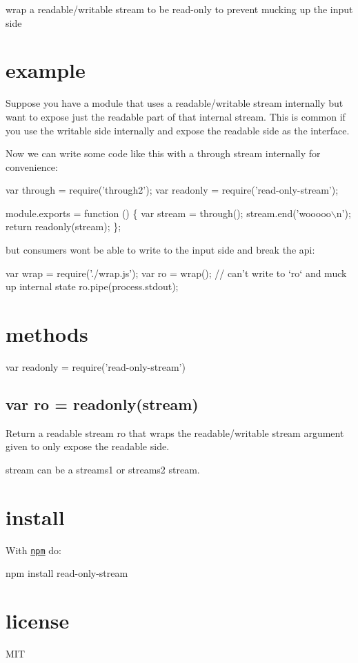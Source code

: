 wrap a readable/writable stream to be read-\/only to prevent mucking up the input side

\href{http://travis-ci.org/substack/read-only-stream}{\tt }

\section*{example}

Suppose you have a module that uses a readable/writable stream internally but want to expose just the readable part of that internal stream. This is common if you use the writable side internally and expose the readable side as the interface.

Now we can write some code like this with a {\ttfamily through} stream internally for convenience\+:


\begin{DoxyCode}
var through = require('through2');
var readonly = require('read-only-stream');

module.exports = function () \{
    var stream = through();
    stream.end('wooooo\(\backslash\)n');
    return readonly(stream);
\};
\end{DoxyCode}


but consumers won\textquotesingle{}t be able to write to the input side and break the api\+:


\begin{DoxyCode}
var wrap = require('./wrap.js');
var ro = wrap(); // can't write to `ro` and muck up internal state
ro.pipe(process.stdout);
\end{DoxyCode}


\section*{methods}


\begin{DoxyCode}
var readonly = require('read-only-stream')
\end{DoxyCode}


\subsection*{var ro = readonly(stream)}

Return a readable stream {\ttfamily ro} that wraps the readable/writable {\ttfamily stream} argument given to only expose the readable side.

{\ttfamily stream} can be a streams1 or streams2 stream.

\section*{install}

With \href{https://npmjs.org}{\tt npm} do\+:


\begin{DoxyCode}
npm install read-only-stream
\end{DoxyCode}


\section*{license}

M\+IT 